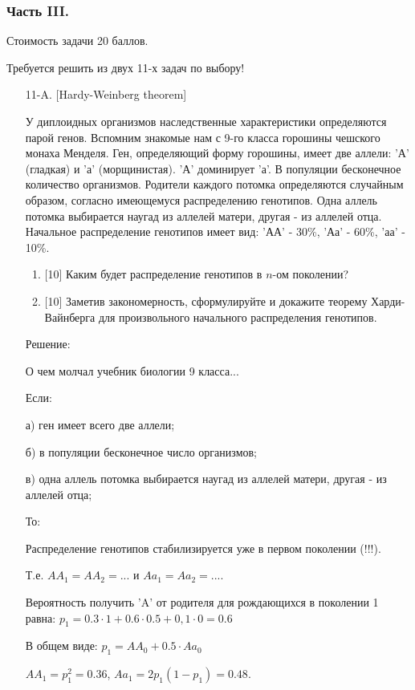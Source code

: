 \documentclass[12pt, a4paper]{article}\usepackage[]{graphicx}\usepackage[]{color}
\begin{document}
\subsubsection*{Часть III.}

Стоимость задачи 20 баллов.

Требуется решить {\bf {}} из двух 11-х задач по
выбору!

\begin{enumerate}
\item[11-A.] [Hardy-Weinberg theorem]

У диплоидных организмов наследственные характеристики определяются
парой генов. Вспомним знакомые нам с 9-го класса горошины чешского
монаха Менделя. Ген, определяющий форму горошины, имеет две
аллели:  'А' (гладкая) и 'а' (морщинистая). 'А' доминирует 'а'. В
популяции бесконечное количество организмов. Родители каждого
потомка определяются случайным образом, согласно имеющемуся
распределению генотипов. Одна аллель потомка выбирается наугад из
аллелей матери, другая - из аллелей отца. Начальное распределение
генотипов имеет вид: 'АА' - 30\%, 'Аа' - 60\%, 'аа' - 10\%.
\begin{enumerate}
\item{} [10] Каким будет распределение генотипов в $n$-ом поколении?
\item{} [10] Заметив закономерность, сформулируйте и докажите теорему
Харди-Вайнберга для произвольного начального распределения
генотипов.
\end{enumerate}

Решение:

О чем молчал учебник биологии 9 класса...

Если:

а) ген имеет всего две аллели;

б) в популяции бесконечное число организмов;

в) одна аллель потомка выбирается наугад из аллелей матери, другая
- из аллелей отца;

То:

Распределение генотипов стабилизируется уже в первом поколении
(!!!).

Т.е.
$AA_{1}=AA_{2}=...$ и $Aa_{1}=Aa_{2}=...$.

Вероятность получить 'A' от родителя для рождающихся в поколении 1
равна: $p_{1}=0.3\cdot 1+0.6\cdot 0.5 + 0,1\cdot 0=0.6$

В общем виде: $p_{1}=AA_{0}+0.5\cdot Aa_{0}$

$AA_{1}=p_{1}^{2}=0.36$, $Aa_{1}=2p_{1}(1-p_{1})=0.48$.


\end{enumerate}
\end{document}
